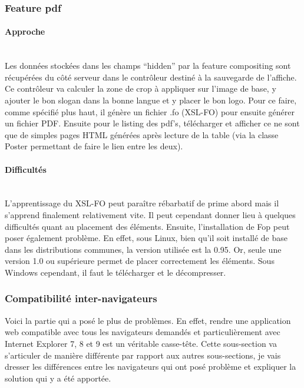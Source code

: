 \documentclass{article}
\begin{document}
\begin{sffamily}
\subsubsection{Feature pdf}

\paragraph{Approche}$ $\\

Les données stockées dans les champs ``hidden'' par la feature compositing sont récupérées du côté serveur dans le contrôleur destiné à la sauvegarde de l'affiche. Ce 
contrôleur va calculer la zone de crop à appliquer sur l'image de base, y ajouter le bon slogan dans la bonne langue et y placer le bon logo. Pour ce faire, comme spécifié 
plus haut, il génère un fichier .fo (XSL-FO) pour ensuite générer un fichier PDF. Ensuite pour le listing des pdf's, télécharger et afficher ce ne sont que de simples pages 
HTML générées après lecture de la table  (via la classe Poster permettant de faire le lien entre les deux).

\paragraph{Difficultés}$ $\\

L'apprentissage du XSL-FO peut paraître rébarbatif de prime abord mais il s'apprend finalement relativement vite. Il peut cependant donner lieu à quelques difficultés quant 
au placement des éléments. Ensuite, l'installation de Fop peut poser également problème. En effet, sous Linux, bien qu'il soit installé de base dans les distributions 
communes, la version utilisée est la 0.95. Or, seule une version 1.0 ou supérieure permet de placer correctement les éléments. Sous Windows cependant, il faut le télécharger 
et le décompresser.

\subsubsection{Compatibilité inter-navigateurs}

Voici la partie qui a posé le plus de problèmes. En effet, rendre une application web compatible avec tous les navigateurs demandés et particulièrement avec Internet 
Explorer 7, 8 et 9 est un véritable casse-tête. Cette sous-section va s'articuler de manière différente par rapport aux autres sous-sections, je vais dresser les différences 
entre les navigateurs qui ont posé problème et expliquer la solution qui y a été apportée.


\end{sffamily}
\end{document}
